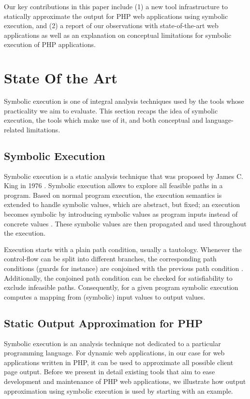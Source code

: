 \documentclass[preprint]{sig-alternate-05-2015}
\begin{document}
Our key contributions in this paper include (1) a new tool infrastructure to statically approximate the output for PHP web applications using symbolic execution, and (2) a report of our observations with state-of-the-art web applications as well as an explanation on conceptual limitations for symbolic execution of PHP applications.

\section{State Of the Art}\label{sec:stateoftheart}
Symbolic execution is one of integral analysis techniques used by the tools whose practicality we aim to evaluate. This section recaps the idea of symbolic execution, the tools which make use of it, and both conceptual and language-related limitations.

\subsection{Symbolic Execution}
Symbolic execution is a static analysis technique that was proposed by James C. King in 1976 \cite{King1976}. Symbolic execution allows to explore all feasible paths in a program. Based on normal program execution, the execution semantics is extended to handle symbolic values, which are abstract, but fixed; an execution becomes symbolic by introducing symbolic values as program inputs instead of concrete values \cite{King1976,Darringer1978}. These symbolic values are then propagated and used throughout the execution. 

Execution starts with a plain path condition, usually a tautology. Whenever the control-flow can be split into different branches, the corresponding path conditions (guards for instance) are conjoined with the previous path condition \cite{King1976}. Additionally, the conjoined path condition can be checked for satisfiability to exclude infeasible paths. Consequently, for a given program symbolic execution computes a mapping from (symbolic) input values to output values. 

\subsection{Static Output Approximation for PHP} \label{sec:workflow}
Symbolic execution is an analysis technique not dedicated to a particular programming language. For dynamic web applications, in our case for web applications written in PHP, it can be used to approximate all possible client page output. Before we present in detail existing tools that aim to ease development and maintenance of PHP web applications, we illustrate how output approximation using symbolic execution is used by starting with an example.
\end{document}
